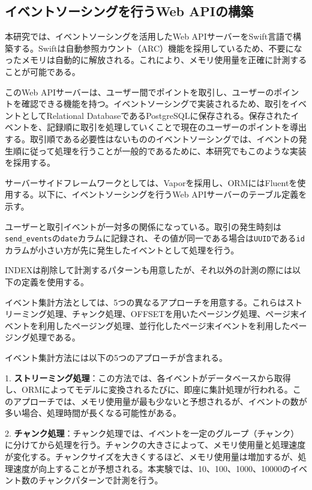 \documentclass[../../../main]{subfiles}
\begin{document}
    \subsection{イベントソーシングを行うWeb APIの構築}\label{subsec:method-event_sourcing_api}

    本研究では、イベントソーシングを活用したWeb APIサーバーをSwift言語で構築する。Swiftは自動参照カウント（ARC）機能を採用しているため、不要になったメモリは自動的に解放される。これにより、メモリ使用量を正確に計測することが可能である。

    このWeb APIサーバーは、ユーザー間でポイントを取引し、ユーザーのポイントを確認できる機能を持つ。イベントソーシングで実装されるため、取引をイベントとしてRelational DatabaseであるPostgreSQLに保存される。保存されたイベントを、記録順に取引を処理していくことで現在のユーザーのポイントを導出する。取引順である必要性はないもののイベントソーシングでは、イベントの発生順に従って処理を行うことが一般的であるために、本研究でもこのような実装を採用する。

    サーバーサイドフレームワークとしては、Vaporを採用し、ORMにはFluentを使用する。以下に、イベントソーシングを行うWeb APIサーバーのテーブル定義を示す。

    

    ユーザーと取引イベントが一対多の関係になっている。取引の発生時刻は\texttt{send\_events}の\texttt{date}カラムに記録され、その値が同一である場合は\texttt{UUID}である\texttt{id}カラムが小さい方が先に発生したイベントとして処理を行う。

    INDEXは削除して計測するパターンも用意したが、それ以外の計測の際には以下の定義を使用する。

    

    イベント集計方法としては、5つの異なるアプローチを用意する。これらはストリーミング処理、チャンク処理、OFFSETを用いたページング処理、ページ末イベントを利用したページング処理、並行化したページ末イベントを利用したページング処理である。

    イベント集計方法には以下の5つのアプローチが含まれる。

    1. \textbf{ストリーミング処理}：この方法では、各イベントがデータベースから取得し、ORMによってモデルに変換されるたびに、即座に集計処理が行われる。このアプローチでは、メモリ使用量が最も少ないと予想されるが、イベントの数が多い場合、処理時間が長くなる可能性がある。

    2. \textbf{チャンク処理}：チャンク処理では、イベントを一定のグループ（チャンク）に分けてから処理を行う。チャンクの大きさによって、メモリ使用量と処理速度が変化する。チャンクサイズを大きくするほど、メモリ使用量は増加するが、処理速度が向上することが予想される。本実験では、10、100、1000、10000のイベント数のチャンクパターンで計測を行う。
\end{document}
